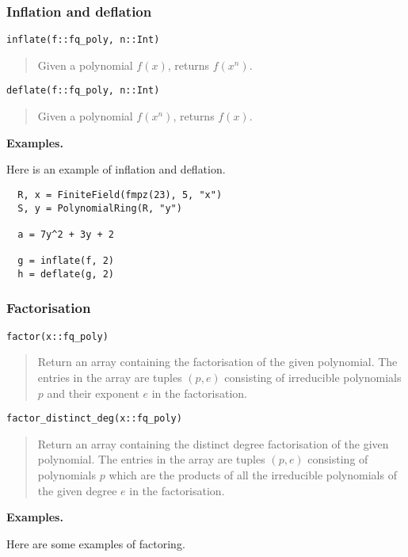 \documentclass[a4paper,10pt]{article}
\newcommand{\desc}[1]{\vspace{-3mm}\begin{quote}#1\end{quote}}
\begin{document}
{{\subsubsection{Inflation and deflation}

\begin{lstlisting}
inflate(f::fq_poly, n::Int)
\end{lstlisting}

\desc{Given a polynomial $f(x)$, returns $f(x^n)$.}

\begin{lstlisting}
deflate(f::fq_poly, n::Int)
\end{lstlisting}

\desc{Given a polynomial $f(x^n)$, returns $f(x)$.}

\textbf{Examples.}

Here is an example of inflation and deflation.

\begin{lstlisting}
  R, x = FiniteField(fmpz(23), 5, "x")
  S, y = PolynomialRing(R, "y")

  a = 7y^2 + 3y + 2

  g = inflate(f, 2)
  h = deflate(g, 2)
\end{lstlisting}

\subsubsection{Factorisation}

\begin{lstlisting}
factor(x::fq_poly)
\end{lstlisting}

\desc{Return an array containing the factorisation of the given polynomial. The entries in
the array are tuples $(p, e)$ consisting of irreducible polynomials $p$ and their exponent
$e$ in the factorisation.}

\begin{lstlisting}
factor_distinct_deg(x::fq_poly)
\end{lstlisting}

\desc{Return an array containing the distinct degree factorisation of the given polynomial.
The entries in the array are tuples $(p, e)$ consisting of polynomials $p$ which are the
products of all the irreducible polynomials of the given degree $e$ in the factorisation.}

\textbf{Examples.}

Here are some examples of factoring.

}}
\end{document}
